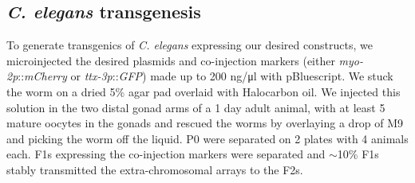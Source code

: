 \subsection{\textit{C. elegans} transgenesis}

To generate transgenics of \textit{C. elegans} expressing our desired constructs, we microinjected the desired plasmids and co-injection markers (either \textit{myo-2p}::\textit{mCherry} or \textit{ttx-3p}::\textit{GFP}) made up to 200 ng/μl with pBluescript. We stuck the worm on a dried 5\% agar pad overlaid with Halocarbon oil. We injected this solution in the two distal gonad arms of a 1 day adult animal, with at least 5 mature oocytes in the gonads and rescued the worms by overlaying a drop of M9 and picking the worm off the liquid. P0 were separated on 2 plates with 4 animals each. F1s expressing the co-injection markers were separated and $\sim$10\% F1s stably transmitted the extra-chromosomal arrays to the F2s. 

